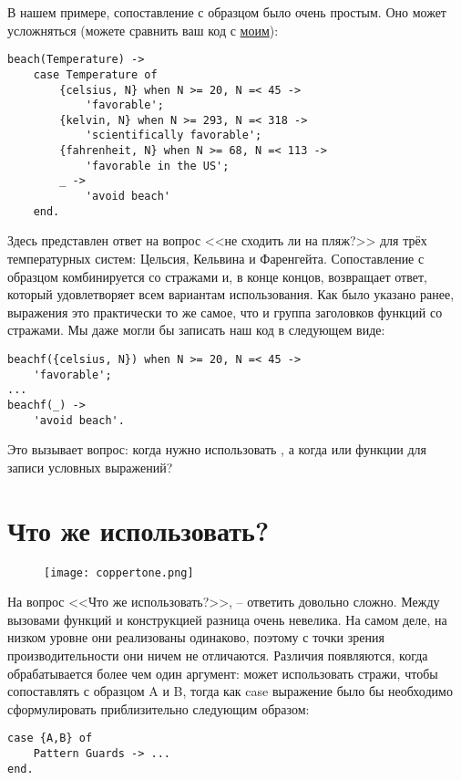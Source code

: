 В нашем примере, сопоставление с образцом было очень простым.
Оно может усложняться (можете сравнить ваш код с \href{http://learnyousomeerlang.com/static/erlang/cases.erl}{моим}):
\begin{lstlisting}[style=erlang]
beach(Temperature) ->
    case Temperature of
        {celsius, N} when N >= 20, N =< 45 ->
            'favorable';
        {kelvin, N} when N >= 293, N =< 318 ->
            'scientifically favorable';
        {fahrenheit, N} when N >= 68, N =< 113 ->
            'favorable in the US';
        _ ->
            'avoid beach'
    end.
\end{lstlisting}
Здесь представлен ответ на вопрос <<не сходить ли  на пляж?>> для трёх температурных систем: Цельсия, Кельвина и Фаренгейта.
Сопоставление с образцом комбинируется со стражами и, в конце концов, возвращает ответ, который удовлетворяет всем вариантам использования.
Как было указано ранее,  выражения  это практически то же самое, что и группа заголовков функций со стражами.
Мы даже могли бы записать наш код в следующем виде:
\begin{lstlisting}[style=erlang]
beachf({celsius, N}) when N >= 20, N =< 45 ->
    'favorable';
...
beachf(_) ->
    'avoid beach'.
\end{lstlisting}

Это вызывает вопрос: когда нужно использовать , а когда  или функции для записи условных выражений?
\section{Что же использовать?}
\begin{figure}[h!]
    \centering
    \texttt{[image: coppertone.png]}
\end{figure}
На вопрос <<Что же использовать?>>, \--- ответить довольно сложно.
Между вызовами функций и конструкцией  разница очень невелика.
На самом деле, на низком уровне они реализованы одинаково, поэтому с точки зрения производительности они ничем не отличаются.
Различия появляются, когда обрабатывается более чем один аргумент:  может использовать стражи, чтобы сопоставлять  с образцом A и B, тогда как case выражение было бы необходимо сформулировать приблизительно следующим образом:
\begin{lstlisting}[style=erlang]
case {A,B} of
    Pattern Guards -> ...
end.
\end{lstlisting}

